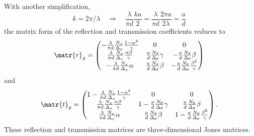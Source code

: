 \begin{refsection}
With another simplification,
\begin{equation}
    k = 2\pi / \lambda
    \quad \Rightarrow \quad
    \frac{\lambda}{\pi d} \frac{ka}{2}
    =
    \frac{\lambda}{\pi d} \frac{2\pi a}{2\lambda}
    =
    \frac{a}{d}
\end{equation}
the matrix form of the reflection and transmission coefficients reduces to
\begin{equation}
    \matr{r}_g =
    \begin{pmatrix}
        -\frac{\lambda}{\pi d}
        \frac{N_x}{\Delta_x}
        \frac{1 - \alpha^2}{\gamma}
        &
        0
        &
        0
        \\
        \frac{\lambda}{\pi d}
        \frac{N_x}{\Delta_x}
        \frac{\alpha \beta}{\gamma}
        &
        \frac{a}{d}
        \frac{N_\theta}{\Delta_\theta}
        \gamma
        &
        -
        \frac{a}{d}
        \frac{N_\theta}{\Delta_\theta}
        \beta
        \\
        -
        \frac{\lambda}{\pi d}
        \frac{N_x}{\Delta_x}
        \alpha
        &
        \frac{a}{d}
        \frac{N_\theta}{\Delta_\theta}
        \beta
        &
        -
        \frac{a}{d}
        \frac{N_\theta}{\Delta_\theta}
        \frac{\beta^2}{\gamma}
    \end{pmatrix}
    \label{eq:grid_rg}
\end{equation}
and
\begin{equation}
    \matr{t}_g =
    \begin{pmatrix}
        1 -
        \frac{\lambda}{\pi d}
        \frac{N_x}{\Delta_x}
        \frac{1 - \alpha^2}{\gamma}
        &
        0
        &
        0
        \\
        \frac{\lambda}{\pi d}
        \frac{N_x}{\Delta_x}
        \frac{\alpha \beta}{\gamma}
        &
        1 -
        \frac{a}{d}
        \frac{N_\theta}{\Delta_\theta}
        \gamma
        &
        \frac{a}{d}
        \frac{N_\theta}{\Delta_\theta}
        \beta
        \\
        \frac{\lambda}{\pi d}
        \frac{N_x}{\Delta_x}
        \alpha
        &
        \frac{a}{d}
        \frac{N_\theta}{\Delta_\theta}
        \beta
        &
        1 -
        \frac{a}{d}
        \frac{N_\theta}{\Delta_\theta}
        \frac{\beta^2}{\gamma}
    \end{pmatrix}
    \text{.}
    \label{eq:grid_tg}
\end{equation}
These reflection and transmission matrices are three-dimensional Jones matrices.


\end{refsection}
